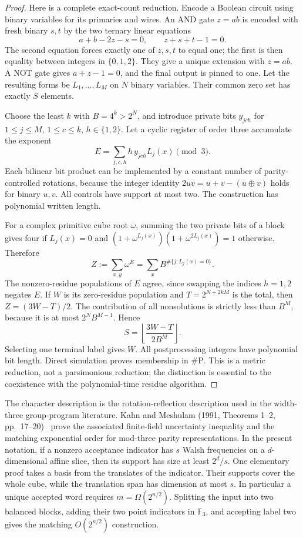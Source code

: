 \begin{proof}
Here is a complete exact-count reduction. Encode a Boolean circuit using binary variables for its primaries and wires. An AND gate $z=ab$ is encoded with fresh binary $s,t$ by the two ternary linear equations
\[
 a+b-2z-s=0,\qquad z+s+t-1=0.
\]
The second equation forces exactly one of $z,s,t$ to equal one; the first is then equality between integers in $\{0,1,2\}$. They give a unique extension with $z=ab$. A NOT gate gives $a+z-1=0$, and the final output is pinned to one. Let the resulting forms be $L_1,\ldots,L_M$ on $N$ binary variables. Their common zero set has exactly $S$ elements.

Choose the least $k$ with $B=4^k>2^N$, and introduce private bits $y_{jch}$ for $1\le j\le M$, $1\le c\le k$, $h\in\{1,2\}$. Let a cyclic register of order three accumulate the exponent
\[
 E=\sum_{j,c,h}h\,y_{jch}L_j(x)\pmod3.
\]
Each bilinear bit product can be implemented by a constant number of parity-controlled rotations, because the integer identity
$2uv=u+v-(u\mathbin\oplus v)$ holds for binary $u,v$. All controls have support at most two. The construction has polynomial written length.

For a complex primitive cube root $\omega$, summing the two private bits of a block gives four if $L_j(x)=0$ and
$(1+\omega^{L_j(x)})(1+\omega^{2L_j(x)})=1$ otherwise. Therefore
\[
 Z:=\sum_{x,y}\omega^E=\sum_xB^{\#\{j:L_j(x)=0\}}.
\]
The nonzero-residue populations of $E$ agree, since swapping the indices $h=1,2$ negates $E$. If $W$ is its zero-residue population and $T=2^{N+2kM}$ is the total, then $Z=(3W-T)/2$. The contribution of all nonsolutions is strictly less than $B^M$, because it is at most $2^NB^{M-1}$. Hence
\[
 S=\left\lfloor\frac{3W-T}{2B^M}\right\rfloor.
\]
Selecting one terminal label gives $W$. All postprocessing integers have polynomial bit length. Direct simulation proves membership in $\#\mathrm P$. This is a metric reduction, not a parsimonious reduction; the distinction is essential to the coexistence with the polynomial-time residue algorithm.
\end{proof}

The character description is the rotation-reflection description used in the width-three group-program literature. Kahn and Meshulam (1991, Theorems 1--2, pp.~17--20)~\cite{st-km} prove the associated finite-field uncertainty inequality and the matching exponential order for mod-three parity representations. In the present notation, if a nonzero acceptance indicator has $s$ Walsh frequencies on a $d$-dimensional affine slice, then its support has size at least $2^d/s$. One elementary proof takes a basis from the translates of the indicator. Their supports cover the whole cube, while the translation span has dimension at most $s$. In particular a unique accepted word requires $m=\Omega(2^{n/2})$. Splitting the input into two balanced blocks, adding their two point indicators in $\mathbb F_3$, and accepting label two gives the matching $O(2^{n/2})$ construction.

